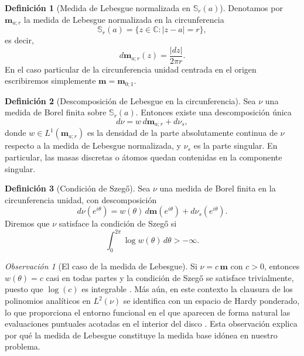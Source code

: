 \documentclass[12pt,a4paper]{article}
\theoremstyle{definition}
\newtheorem{definition}{Definición}
\theoremstyle{remark}
\newtheorem{remark}{Observación}
\newcommand{\C}{\mathbb{C}}
\newcommand{\abs}[1]{\left| #1 \right|}
\begin{document}
\begin{definition}[Medida de Lebesgue normalizada en $\mathbb{S}_r(a)$]
  Denotamos por $\mathbf{m}_{a;r}$ la medida de Lebesgue normalizada en la circunferencia
  $$\mathbb{S}_r(a) = \{z \in \C : \abs{z-a} = r\},$$
  es decir,
  \begin{equation}
    d\mathbf{m}_{a;r}(z) = \frac{\abs{dz}}{2\pi r}.
  \end{equation}
  En el caso particular de la circunferencia unidad centrada en el origen escribiremos simplemente $\mathbf{m} = \mathbf{m}_{0;1}$.
\end{definition}

\begin{definition}[Descomposición de Lebesgue en la circunferencia]
  Sea $\nu$ una medida de Borel finita sobre $\mathbb{S}_r(a)$. Entonces existe una descomposición única
  \begin{equation}
    d\nu = w\, d\mathbf{m}_{a;r} + d\nu_s,
  \end{equation}
  donde $w \in L^1(\mathbf{m}_{a;r})$ es la densidad de la parte absolutamente continua de $\nu$ respecto a la medida de Lebesgue normalizada, y $\nu_s$ es la parte singular. En particular, las masas discretas o átomos quedan contenidas en la componente singular.
\end{definition}

\begin{definition}[Condición de Szegő]
  Sea $\nu$ una medida de Borel finita en la circunferencia unidad, con descomposición
  \begin{equation}
    d\nu(e^{i\theta}) = w(\theta)\, d\mathbf{m}(e^{i\theta}) + d\nu_s(e^{i\theta}).
  \end{equation}
  Diremos que $\nu$ satisface la condición de Szegő si
  \begin{equation}
    \int_0^{2\pi} \log w(\theta)\, d\theta > -\infty.
  \end{equation}
\end{definition}

\begin{remark}[El caso de la medida de Lebesgue]
  Si $\nu = c\,\mathbf{m}$ con $c>0$, entonces $w(\theta)=c$ casi en todas partes y la condición de Szegő se satisface trivialmente, puesto que $\log(c)$ es integrable \cite{szego1975orthogonal}. Más aún, en este contexto la clausura de los polinomios analíticos en $L^2(\nu)$ se identifica con un espacio de Hardy ponderado, lo que proporciona el entorno funcional en el que aparecen de forma natural las evaluaciones puntuales acotadas en el interior del disco \cite{duren1970theory}. Esta observación explica por qué la medida de Lebesgue constituye la medida base idónea en nuestro problema.
\end{remark}
\end{document}
